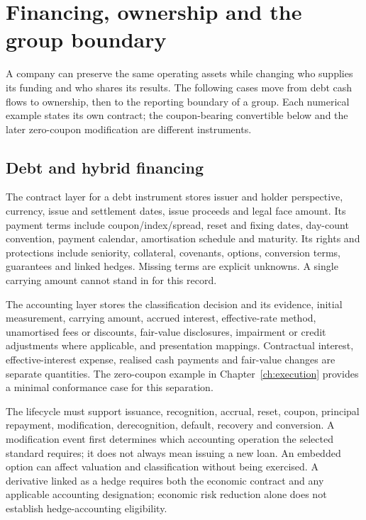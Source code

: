 \chapter{Financing, ownership and the group boundary}
\label{ch:financing-groups}

A company can preserve the same operating assets while changing who supplies
its funding and who shares its results. The following cases move from debt
cash flows to ownership, then to the reporting boundary of a group. Each
numerical example states its own contract; the coupon-bearing convertible
below and the later zero-coupon modification are different instruments.

\section{Debt and hybrid financing}

The contract layer for a debt instrument stores issuer and holder perspective,
currency, issue and settlement dates, issue proceeds and legal face amount.
Its payment terms include coupon/index/spread, reset and fixing dates,
day-count convention, payment calendar, amortisation schedule and maturity.
Its rights and protections include seniority, collateral, covenants, options,
conversion terms, guarantees and linked hedges. Missing terms are
explicit unknowns. A single carrying amount cannot stand in for this record.

The accounting layer stores the classification decision and its evidence,
initial measurement, carrying amount, accrued interest, effective-rate method,
unamortised fees or discounts, fair-value disclosures, impairment or credit
adjustments where applicable, and presentation mappings. Contractual interest,
effective-interest expense, realised cash payments and fair-value changes are
separate quantities. The zero-coupon example in Chapter~\ref{ch:execution}
provides a minimal conformance case for this separation.

The lifecycle must support issuance, recognition, accrual, reset, coupon,
principal repayment, modification, derecognition, default, recovery and
conversion. A modification event first determines which accounting operation
the selected standard requires; it does not always mean issuing a new loan.
An embedded option can affect valuation and classification without being
exercised. A derivative linked as a hedge requires both the economic contract
and any applicable accounting designation; economic risk reduction alone does
not establish hedge-accounting eligibility.

